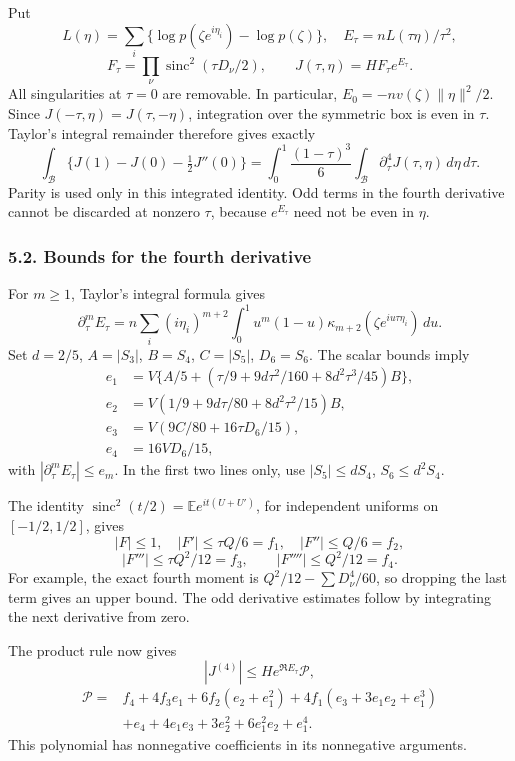 \documentclass[
  11pt,
]{article}
\begin{document}
Put \[
 L(\eta)=\sum_i\{\log p(\zeta e^{i\eta_i})-\log p(\zeta)\},
 \quad E_\tau=nL(\tau\eta)/\tau^2,
\] \[
 F_\tau=\prod_\nu\operatorname{sinc}^2(\tau D_\nu/2),
 \qquad J(\tau,\eta)=H F_\tau e^{E_\tau}.
\] All singularities at \(\tau=0\) are removable. In particular,
\(E_0=-nv(\zeta)\|\eta\|^2/2\). Since \(J(-\tau,\eta)=J(\tau,-\eta)\),
integration over the symmetric box is even in \(\tau\). Taylor's
integral remainder therefore gives exactly \[
 \int_{\mathcal B}\{J(1)-J(0)-\tfrac12J''(0)\}
 =\int_0^1\frac{(1-\tau)^3}{6}
       \int_{\mathcal B}\partial_\tau^4J(\tau,\eta)\,d\eta\,d\tau.
                                                               \tag{5.2}
\] Parity is used only in this integrated identity. Odd terms in the
fourth derivative cannot be discarded at nonzero \(\tau\), because
\(e^{E_\tau}\) need not be even in \(\eta\).

\subsubsection{5.2. Bounds for the fourth
derivative}\label{bounds-for-the-fourth-derivative}

For \(m\ge1\), Taylor's integral formula gives \[
 \partial_\tau^m E_\tau
 =n\sum_i(i\eta_i)^{m+2}
       \int_0^1 u^m(1-u)
       \kappa_{m+2}(\zeta e^{iu\tau\eta_i})\,du.                \tag{5.3}
\] Set \(d=2/5\), \(A=|S_3|\), \(B=S_4\), \(C=|S_5|\), \(D_6=S_6\). The
scalar bounds imply \[
\begin{aligned}
 e_1&=V\{A/5+(\tau/9+9d\tau^2/160+8d^2\tau^3/45)B\},\\
 e_2&=V(1/9+9d\tau/80+8d^2\tau^2/15)B,\\
 e_3&=V(9C/80+16\tau D_6/15),\\
 e_4&=16VD_6/15,
\end{aligned}                                                   \tag{5.4}
\] with \(|\partial_\tau^mE_\tau|\le e_m\). In the first two lines only,
use \(|S_5|\le dS_4\), \(S_6\le d^2S_4\).

The identity \(\operatorname{sinc}^2(t/2)=\mathbb E e^{it(U+U')}\), for
independent uniforms on \([-1/2,1/2]\), gives \[
 |F|\le1,\quad |F'|\le\tau Q/6=f_1,\quad |F''|\le Q/6=f_2,
\] \[
 |F'''|\le\tau Q^2/12=f_3,\qquad |F''''|\le Q^2/12=f_4.         \tag{5.5}
\] For example, the exact fourth moment is \(Q^2/12-\sum D_\nu^4/60\),
so dropping the last term gives an upper bound. The odd derivative
estimates follow by integrating the next derivative from zero.

The product rule now gives \[
 |J^{(4)}|\le H e^{\Re E_\tau}\mathcal P,
\] \[
\begin{aligned}
\mathcal P={}&f_4+4f_3e_1+6f_2(e_2+e_1^2)
 +4f_1(e_3+3e_1e_2+e_1^3)\\
 &+e_4+4e_1e_3+3e_2^2+6e_1^2e_2+e_1^4.                       \end{aligned} \tag{5.6}
\] This polynomial has nonnegative coefficients in its nonnegative
arguments.
\end{document}
